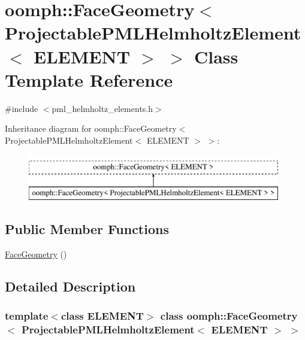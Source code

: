\hypertarget{classoomph_1_1FaceGeometry_3_01ProjectablePMLHelmholtzElement_3_01ELEMENT_01_4_01_4}{}\section{oomph\+:\+:Face\+Geometry$<$ Projectable\+P\+M\+L\+Helmholtz\+Element$<$ E\+L\+E\+M\+E\+NT $>$ $>$ Class Template Reference}
\label{classoomph_1_1FaceGeometry_3_01ProjectablePMLHelmholtzElement_3_01ELEMENT_01_4_01_4}


{\ttfamily \#include $<$pml\+\_\+helmholtz\+\_\+elements.\+h$>$}

Inheritance diagram for oomph\+:\+:Face\+Geometry$<$ Projectable\+P\+M\+L\+Helmholtz\+Element$<$ E\+L\+E\+M\+E\+NT $>$ $>$\+:\begin{figure}[H]
\begin{center}
\leavevmode
\includegraphics[height=2.000000cm]{classoomph_1_1FaceGeometry_3_01ProjectablePMLHelmholtzElement_3_01ELEMENT_01_4_01_4}
\end{center}
\end{figure}
\subsection*{Public Member Functions}
\begin{DoxyCompactItemize}
\item 
\hyperlink{classoomph_1_1FaceGeometry_3_01ProjectablePMLHelmholtzElement_3_01ELEMENT_01_4_01_4_ac68bbbfd50ee9671387ce432a63e166e}{Face\+Geometry} ()
\end{DoxyCompactItemize}


\subsection{Detailed Description}
\subsubsection*{template$<$class E\+L\+E\+M\+E\+NT$>$\newline
class oomph\+::\+Face\+Geometry$<$ Projectable\+P\+M\+L\+Helmholtz\+Element$<$ E\+L\+E\+M\+E\+N\+T $>$ $>$}

